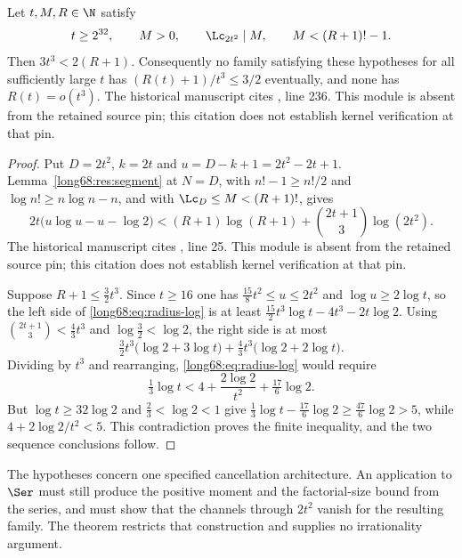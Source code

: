 \label{long68:res:lead-channel-radius}
\begin{theorem}\label{long68:res:channel-radius}
Let $t,M,R\in\N$ satisfy
\[
 t\ge2^{32},\qquad M>0,\qquad \Lc_{2t^2}\mid M,\qquad M<(R+1)!-1 .
\]
Then $3t^3<2(R+1)$.  Consequently no family satisfying these hypotheses for
all sufficiently large $t$ has $(R(t)+1)/t^3\le3/2$ eventually, and none has
$R(t)=o(t^3)$.
  The historical manuscript cites , line 236. This module is absent from the retained source pin; this citation does not establish kernel verification at that pin.
\end{theorem}

\begin{proof}
Put $D=2t^2$, $k=2t$ and $u=D-k+1=2t^2-2t+1$.  Lemma~\ref{long68:res:segment} at
$N=D$, with $n!-1\ge n!/2$ and $\log n!\ge n\log n-n$, and with
$\Lc_D\le M<(R+1)!$, gives
\begin{equation}\label{long68:eq:radius-log}
 2t\bigl(u\log u-u-\log2\bigr)
 <(R+1)\log(R+1)+\binom{2t+1}{3}\log(2t^2).
\end{equation}
  The historical manuscript cites , line 25. This module is absent from the retained source pin; this citation does not establish kernel verification at that pin.

Suppose $R+1\le\tfrac32t^3$.  Since $t\ge16$ one has
$\tfrac{15}{8}t^2\le u\le2t^2$ and $\log u\ge2\log t$, so the left side of
\eqref{long68:eq:radius-log} is at least
$\tfrac{15}{2}t^3\log t-4t^3-2t\log2$.  Using
$\binom{2t+1}{3}<\tfrac43t^3$ and $\log\tfrac32<\log2$, the right side is at
most
\[
 \tfrac32t^3\bigl(\log2+3\log t\bigr)+\tfrac43t^3\bigl(\log2+2\log t\bigr).
\]
Dividing by $t^3$ and rearranging, \eqref{long68:eq:radius-log} would require
\[
 \tfrac13\log t<4+\frac{2\log2}{t^2}+\tfrac{17}6\log2 .
\]
But $\log t\ge32\log2$ and $\tfrac23<\log2<1$ give
$\tfrac13\log t-\tfrac{17}6\log2\ge\tfrac{47}6\log2>5$, while
$4+2\log2/t^2<5$.  This contradiction proves the finite inequality, and the
two sequence conclusions follow.
\end{proof}

The hypotheses concern one specified cancellation architecture.  An
application to $\Ser$ must still produce the positive moment and the
factorial-size bound from the series, and must show that the channels through
$2t^2$ vanish for the resulting family.  The theorem restricts that
construction and supplies no irrationality argument.

